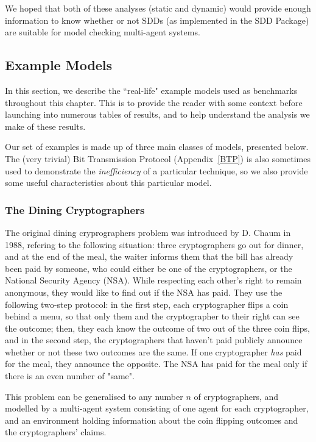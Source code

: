 \documentclass[11pt]{report}
\begin{document}
We hoped that both of these analyses (static and dynamic) would provide enough information to know whether or not SDDs (as implemented in the SDD Package) are suitable for model checking multi-agent systems.

\subsection{Example Models}
\label{ispl_examples}

In this section, we describe the ``real-life" example models used as benchmarks throughout this chapter. This is to provide the reader with some context before launching into numerous tables of results, and to help understand the analysis we make of these results. 

Our set of examples is made up of three main classes of models, presented below. The (very trivial) Bit Transmission Protocol (Appendix~\ref{BTP}) is also sometimes used to demonstrate the \textit{inefficiency} of a particular technique, so we also provide some useful characteristics about this particular model. 

\subsubsection{The Dining Cryptographers}

The original dining cryprographers problem was introduced by D. Chaum in 1988, refering to the following situation: three cryptographers go out for dinner, and at the end of the meal, the waiter informs them that the bill has already been paid by someone, who could either be one of the cryptographers, or the National Security Agency (NSA). While respecting each other's right to remain anonymous, they would like to find out if the NSA has paid. They use the following two-step protocol: in the first step, each cryptographer flips a coin behind a menu, so that only them and the cryptographer to their right can see the outcome; then, they each know the outcome of two out of the three coin flips, and in the second step, the cryptographers that haven't paid publicly announce whether or not these two outcomes are the same. If one cryptographer \textit{has} paid for the meal, they announce the opposite. The NSA has paid for the meal only if there is an even number of "same". 

This problem can be generalised to any number $n$ of cryptographers, and modelled by a multi-agent system consisting of one agent for each cryptographer, and an environment holding information about the coin flipping outcomes and the cryptographers' claims.
\end{document}
